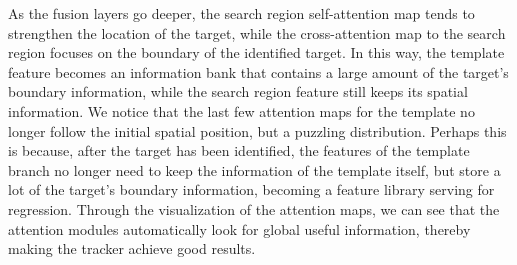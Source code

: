 \documentclass[final]{cvpr}
\begin{document}
As the fusion layers go deeper, the search region self-attention map tends to strengthen the 
location of the target, while the cross-attention map to the search region focuses on the boundary of the identified target. 
In this way, the template feature becomes an information bank that contains a large amount of the target's boundary 
information, while the search region feature still keeps its spatial information. We notice that the last few attention 
maps for the template no longer follow the initial spatial position, but a puzzling distribution. 
Perhaps this is because, after the target has been identified, the features of the template branch no longer need to 
keep the information of the template itself, but store a lot of the target's boundary information, becoming a feature 
library serving for regression. Through the visualization of the attention maps, we can see that the attention 
modules automatically look for global useful information, thereby making the tracker achieve good results. 
\end{document}
